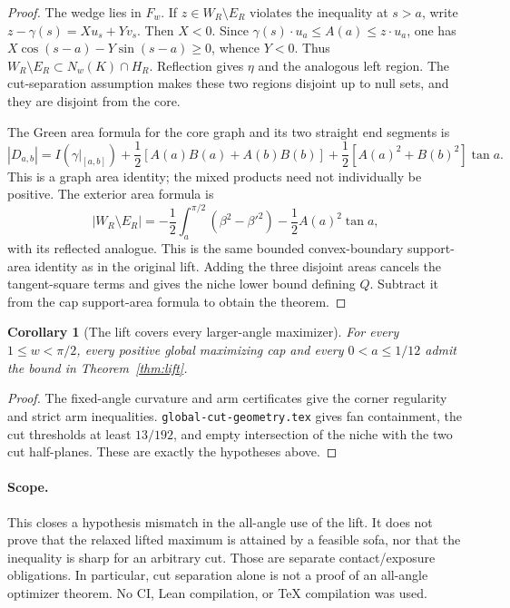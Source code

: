 \documentclass[11pt]{article}
\newtheorem{corollary}{Corollary}
\begin{document}
\begin{proof}
The wedge lies in $F_w$. If $z\in W_R\setminus E_R$ violates the inequality at $s>a$, write $z-\gamma(s)=Xu_s+Yv_s$. Then $X<0$. Since $\gamma(s)\cdot u_a\le A(a)\le z\cdot u_a$, one has $X\cos(s-a)-Y\sin(s-a)\ge0$, whence $Y<0$. Thus $W_R\setminus E_R\subset N_w(K)\cap H_R$. Reflection gives $\eta$ and the analogous left region. The cut-separation assumption makes these two regions disjoint up to null sets, and they are disjoint from the core.

The Green area formula for the core graph and its two straight end segments is
\[
 |D_{a,b}|=I(\gamma|_{[a,b]})+\frac12[A(a)B(a)+A(b)B(b)]
 +\frac12[A(a)^2+B(b)^2]\tan a.
\]
This is a graph area identity; the mixed products need not individually be positive. The exterior area formula is
\[
 |W_R\setminus E_R|=-\frac12\int_a^{\pi/2}(\beta^2-\beta'^2)-\frac12A(a)^2\tan a,
\]
with its reflected analogue. This is the same bounded convex-boundary support-area identity as in the original lift. Adding the three disjoint areas cancels the tangent-square terms and gives the niche lower bound defining $Q$. Subtract it from the cap support-area formula to obtain the theorem.
\end{proof}

\begin{corollary}[The lift covers every larger-angle maximizer]
For every $1\le w<\pi/2$, every positive global maximizing cap and every $0<a\le1/12$ admit the bound in Theorem~\ref{thm:lift}.
\end{corollary}
\begin{proof}
The fixed-angle curvature and arm certificates give the corner regularity and strict arm inequalities. \texttt{global-cut-geometry.tex} gives fan containment, the cut thresholds at least $13/192$, and empty intersection of the niche with the two cut half-planes. These are exactly the hypotheses above.
\end{proof}

\paragraph{Scope.}
This closes a hypothesis mismatch in the all-angle use of the lift. It does not prove that the relaxed lifted maximum is attained by a feasible sofa, nor that the inequality is sharp for an arbitrary cut. Those are separate contact/exposure obligations. In particular, cut separation alone is not a proof of an all-angle optimizer theorem. No CI, Lean compilation, or TeX compilation was used.
\end{document}
